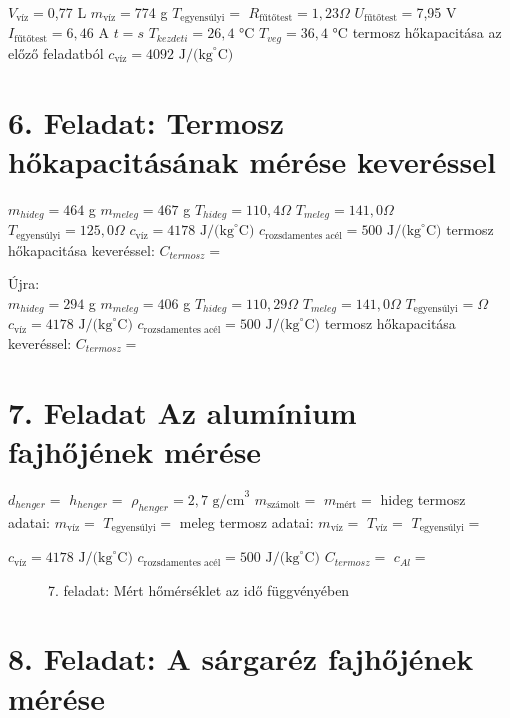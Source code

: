\documentclass{article}
\begin{document}
$V_{\text{víz}}=$0,77 L
$m_{\text{víz}}=$774 g
$T_{\text{egyensúlyi}}=$
$R_{\text{fűtőtest}}=1,23 \Omega$
$U_{\text{fűtőtest}}=$7,95 V
$I_{\text{fűtőtest}}=6,46$ A
$t=s$
$T_{kezdeti}=26,4$ °C
$T_{veg}=36,4$ °C
termosz hőkapacitása az előző feladatból
$c_{\text{víz}}=4092 \text{ J/(kg}^{\circ}\text{C)}$


\section*{6. Feladat: Termosz hőkapacitásának mérése keveréssel}

$m_{hideg}=464$ g
$m_{meleg}=467$ g
$T_{hideg}=110,4 \Omega$
$T_{meleg}=141,0 \Omega$
$T_{\text{egyensúlyi}}=125,0 \Omega$
$c_{\text{víz}}= 4178 \text{ J/(kg}^{\circ}\text{C)}$   %
$c_{\text{rozsdamentes acél}}=500 \text{ J/(kg}^{\circ}\text{C)}$
termosz hőkapacitása keveréssel: $C_{termosz}=$

Újra:\\
$m_{hideg}=294$ g
$m_{meleg}=406$ g
$T_{hideg}=110,29 \Omega$
$T_{meleg}=141,0 \Omega$
$T_{\text{egyensúlyi}}= \Omega$
$c_{\text{víz}}= 4178 \text{ J/(kg}^{\circ}\text{C)}$   %
$c_{\text{rozsdamentes acél}}=500 \text{ J/(kg}^{\circ}\text{C)}$
termosz hőkapacitása keveréssel: $C_{termosz}=$



\section*{7. Feladat Az alumínium fajhőjének mérése}

$d_{henger}=$
$h_{henger}=$
$\rho_{henger}=2,7 \text{ g/cm}^3$
$m_{\text{számolt}}=$
$m_{\text{mért}}=$
hideg termosz adatai:
$m_{\text{víz}}=$
$T_{\text{egyensúlyi}}=$
meleg termosz adatai:
$m_{\text{víz}}=$
$T_{\text{víz}}=$
$T_{\text{egyensúlyi}}=$

$c_{\text{víz}}= 4178 \text{ J/(kg}^{\circ}\text{C)}$   %
$c_{\text{rozsdamentes acél}}=500 \text{ J/(kg}^{\circ}\text{C)}$
$C_{termosz}=$
$c_{Al}=$

\begin{figure}[H]
    \centering
    \caption*{7. feladat: Mért hőmérséklet az idő függvényében}
    \label{}
\end{figure}

\section*{8. Feladat: A sárgaréz fajhőjének mérése}
\end{document}
